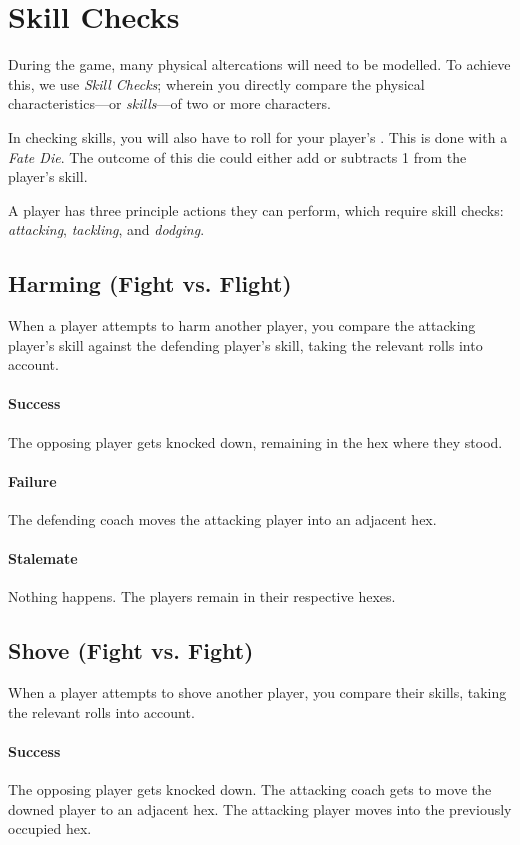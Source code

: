 \section{Skill Checks}\label{skill-checks}
During the game, many physical altercations will need to be modelled.
To achieve this, we use \textit{Skill Checks}; wherein you directly compare the physical characteristics---or \textit{skills}---of two or more characters.

In checking skills, you will also have to roll for your player's \fate{}.
This is done with a \textit{Fate Die}.
The outcome of this die could either add or subtracts 1 from the player's skill.

A player has three principle actions they can perform, which require skill checks: \textit{attacking}, \textit{tackling}, and \textit{dodging}.

\subsection{Harming (Fight vs. Flight)}
When a player attempts to harm another player, you compare the attacking player's \fight{} skill against the defending player's \flight{} skill, taking the relevant \fate{} rolls into account.

\paragraph{Success}
The opposing player gets knocked down, remaining in the hex where they stood.
\paragraph{Failure}
The defending coach moves the attacking player into an adjacent hex.
\paragraph{Stalemate}
Nothing happens.
The players remain in their respective hexes.

\subsection{Shove (Fight vs. Fight)}
When a player attempts to shove another player, you compare their \fight{} skills, taking the relevant \fate{} rolls into account.

\paragraph{Success} 
The opposing player gets knocked down. 
The attacking coach gets to move the downed player to an adjacent hex.
The attacking player moves into the previously occupied hex.
